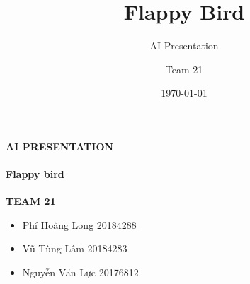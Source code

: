 \documentclass[10pt]{beamer}
\title{Flappy Bird}
\subtitle{AI Presentation}
\author{Team 21}
\institute{HUST}
\date{\today}
\begin{document}
{
%
\begin{frame}{\textbf{AI PRESENTATION}}
    \framesubtitle{Flappy bird}
    \textbf{TEAM 21}
\begin{itemize}
\item Phí Hoàng Long      20184288
\item Vũ Tùng Lâm         20184283
\item Nguyễn Văn Lực      20176812
\end{itemize}
\vspace{4cm}
\end{frame}
}
\end{document}
